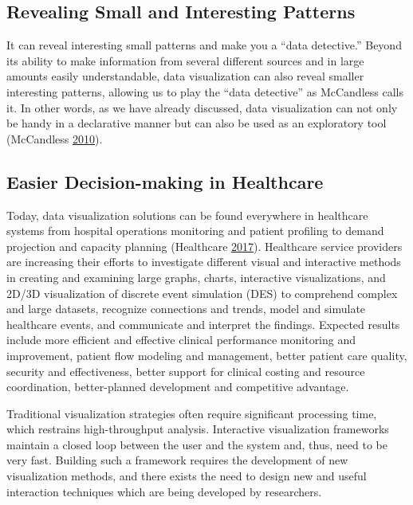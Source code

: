\documentclass[]{book}
\begin{document}
\subsection{Revealing Small and Interesting
Patterns}\label{revealing-small-and-interesting-patterns}

It can reveal interesting small patterns and make you a ``data
detective.'' Beyond its ability to make information from several
different sources and in large amounts easily understandable, data
visualization can also reveal smaller interesting patterns, allowing us
to play the ``data detective'' as McCandless calls it. In other words,
as we have already discussed, data visualization can not only be handy
in a declarative manner but can also be used as an exploratory tool
(McCandless \protect\hyperlink{ref-viz_ted}{2010}).

\subsection{Easier Decision-making in
Healthcare}\label{easier-decision-making-in-healthcare}

Today, data visualization solutions can be found everywhere in
healthcare systems from hospital operations monitoring and patient
profiling to demand projection and capacity planning (Healthcare
\protect\hyperlink{ref-marksman}{2017}). Healthcare service providers
are increasing their efforts to investigate different visual and
interactive methods in creating and examining large graphs, charts,
interactive visualizations, and 2D/3D visualization of discrete event
simulation (DES) to comprehend complex and large datasets, recognize
connections and trends, model and simulate healthcare events, and
communicate and interpret the findings. Expected results include more
efficient and effective clinical performance monitoring and improvement,
patient flow modeling and management, better patient care quality,
security and effectiveness, better support for clinical costing and
resource coordination, better-planned development and competitive
advantage.

Traditional visualization strategies often require significant
processing time, which restrains high-throughput analysis. Interactive
visualization frameworks maintain a closed loop between the user and the
system and, thus, need to be very fast. Building such a framework
requires the development of new visualization methods, and there exists
the need to design new and useful interaction techniques which are being
developed by researchers.
\end{document}

